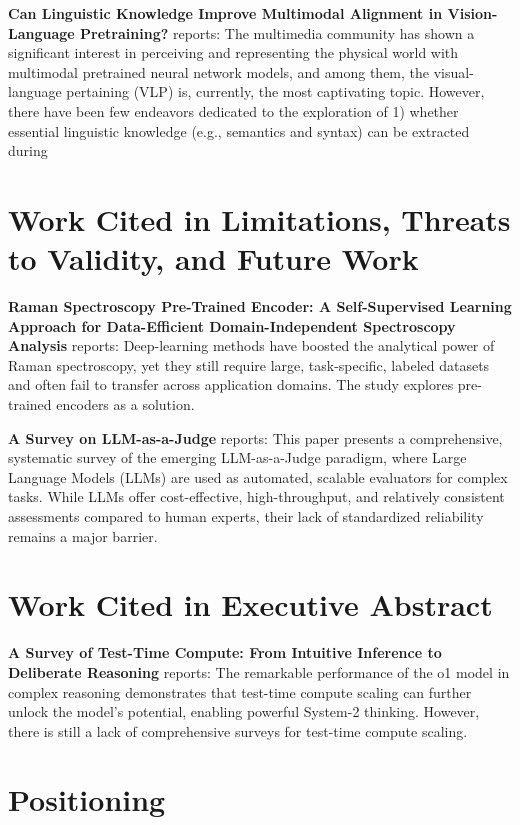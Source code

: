 \documentclass[10pt,journal,compsoc,twocolumn]{IEEEtran}
\begin{document}
\textbf{Can Linguistic Knowledge Improve Multimodal Alignment in Vision-Language Pretraining?} \cite{arxiv_2308_12898} reports: The multimedia community has shown a significant interest in perceiving and representing the physical world with multimodal pretrained neural network models, and among them, the visual-language pertaining (VLP) is, currently, the most captivating topic. However, there have been few endeavors dedicated to the exploration of 1) whether essential linguistic knowledge (e.g., semantics and syntax) can be extracted during 


\section{Work Cited in Limitations, Threats to Validity, and Future Work}


\textbf{Raman Spectroscopy Pre-Trained Encoder: A Self-Supervised Learning Approach for Data-Efficient Domain-Independent Spectroscopy Analysis} \cite{doaj_001772c2113c476d9d5d40452c8e10e1} reports: Deep-learning methods have boosted the analytical power of Raman spectroscopy, yet they still require large, task-specific, labeled datasets and often fail to transfer across application domains. The study explores pre-trained encoders as a solution.

\textbf{A Survey on LLM-as-a-Judge} \cite{arxiv_2411_15594} reports: This paper presents a comprehensive, systematic survey of the emerging LLM-as-a-Judge paradigm, where Large Language Models (LLMs) are used as automated, scalable evaluators for complex tasks. While LLMs offer cost-effective, high-throughput, and relatively consistent assessments compared to human experts, their lack of standardized reliability remains a major barrier.


\section{Work Cited in Executive Abstract}


\textbf{A Survey of Test-Time Compute: From Intuitive Inference to Deliberate Reasoning} \cite{arxiv_2501_02497} reports: The remarkable performance of the o1 model in complex reasoning demonstrates that test-time compute scaling can further unlock the model's potential, enabling powerful System-2 thinking. However, there is still a lack of comprehensive surveys for test-time compute scaling.


\section{Positioning}
\end{document}
